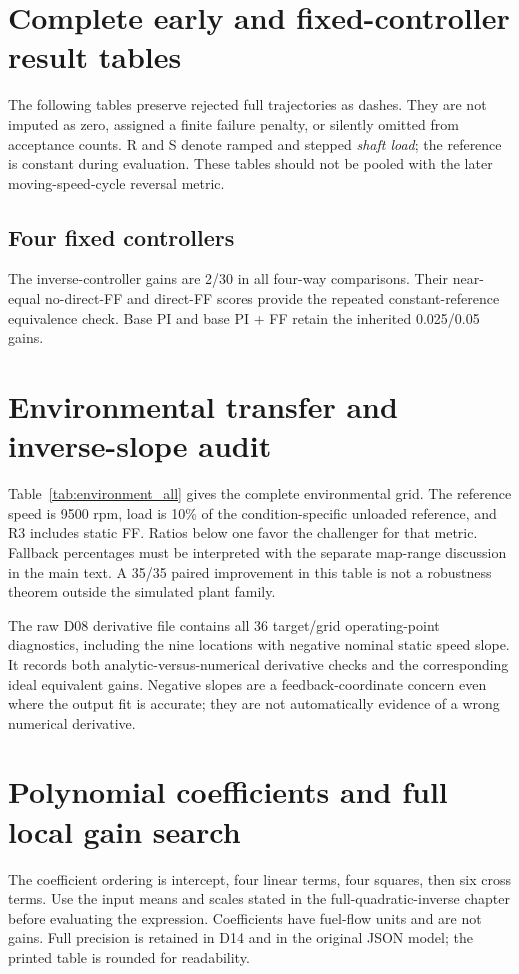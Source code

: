 
\chapter{Complete early and fixed-controller result tables}
\label{app:early}
The following tables preserve rejected full trajectories as dashes. They are not imputed as zero, assigned a finite failure penalty, or silently omitted from acceptance counts. R and S denote ramped and stepped \emph{shaft load}; the reference is constant during evaluation. These tables should not be pooled with the later moving-speed-cycle reversal metric.


\clearpage
\section{Four fixed controllers}
\label{app:fixed}
The inverse-controller gains are 2/30 in all four-way comparisons. Their near-equal no-direct-FF and direct-FF scores provide the repeated constant-reference equivalence check. Base PI and base PI + FF retain the inherited 0.025/0.05 gains.



\clearpage

\chapter{Environmental transfer and inverse-slope audit}
\label{app:grid}
Table~\ref{tab:environment_all} gives the complete environmental grid. The reference speed is 9500 rpm, load is 10\% of the condition-specific unloaded reference, and R3 includes static FF. Ratios below one favor the challenger for that metric. Fallback percentages must be interpreted with the separate map-range discussion in the main text. A 35/35 paired improvement in this table is not a robustness theorem outside the simulated plant family.

The raw D08 derivative file contains all 36 target/grid operating-point diagnostics, including the nine locations with negative nominal static speed slope. It records both analytic-versus-numerical derivative checks and the corresponding ideal equivalent gains. Negative slopes are a feedback-coordinate concern even where the output fit is accurate; they are not automatically evidence of a wrong numerical derivative.

\chapter{Polynomial coefficients and full local gain search}
\label{app:poly}
The coefficient ordering is intercept, four linear terms, four squares, then six cross terms. Use the input means and scales stated in the full-quadratic-inverse chapter before evaluating the expression. Coefficients have fuel-flow units and are not gains. Full precision is retained in D14 and in the original JSON model; the printed table is rounded for readability.

\clearpage
